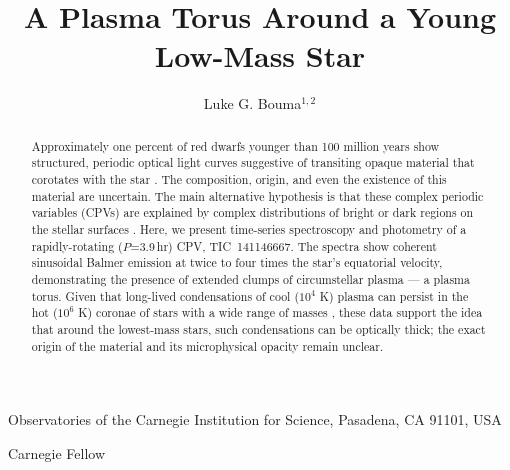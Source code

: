 \documentclass{nature3}
\title{A Plasma Torus Around a Young Low-Mass Star}
\newcommand{\carnegie}{Observatories of the Carnegie Institution for Science, Pasadena, CA 91101, USA}
\begin{document}
\author{Luke G. Bouma$^{1,2}$}

\maketitle

\scriptsize
\begin{affiliations}
\item \carnegie
\item Carnegie Fellow
\end{affiliations}
\normalsize


\begin{abstract}
\normalfont
Approximately one percent of red dwarfs younger than 100 million years
show structured, periodic optical light curves suggestive of
transiting opaque material that corotates with the star
\cite{Rebull2016,Stauffer2017,Rebull2018,Bouma2024}.  The
composition, origin, and even the existence of this material are
uncertain. The main alternative hypothesis is that these complex
periodic variables (CPVs) are explained by complex distributions of
bright or dark regions on the stellar surfaces
\cite{Koen2021}.  Here, we present time-series spectroscopy and
photometry of a rapidly-rotating ($P$=3.9\,hr)
CPV, TIC~141146667. The spectra show coherent sinusoidal Balmer
emission at twice to four times the star's equatorial velocity,
demonstrating the presence of extended clumps of circumstellar
plasma --- a plasma torus.  Given that long-lived condensations of
cool ($10^4$ K) plasma can persist in the hot ($10^6$ K) coronae of
stars with a wide range of masses
\cite{CollierCameron1989,Townsend2005,Dunstone2006,Petit2013,Waugh2022,Daley-Yates2024},
these data support the idea that around the lowest-mass stars, such
condensations can be optically thick; the exact origin of the
material and its microphysical opacity remain unclear.
\end{abstract}

\maketitle

\end{document}

